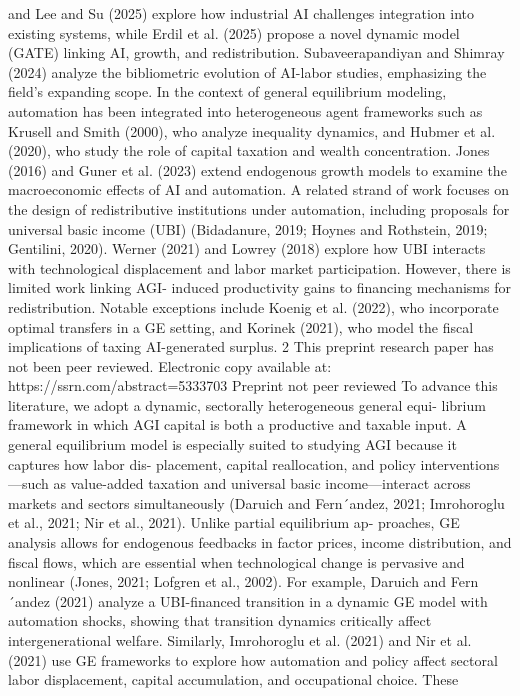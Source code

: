 and Lee and Su (2025) explore how industrial AI challenges integration into existing systems,
while Erdil et al. (2025) propose a novel dynamic model (GATE) linking AI, growth, and
redistribution. Subaveerapandiyan and Shimray (2024) analyze the bibliometric evolution
of AI-labor studies, emphasizing the field’s expanding scope.
In the context of general equilibrium modeling, automation has been integrated into
heterogeneous agent frameworks such as Krusell and Smith (2000), who analyze inequality
dynamics, and Hubmer et al. (2020), who study the role of capital taxation and wealth
concentration.
Jones (2016) and Guner et al. (2023) extend endogenous growth models
to examine the macroeconomic effects of AI and automation.
A related strand of work
focuses on the design of redistributive institutions under automation, including proposals
for universal basic income (UBI) (Bidadanure, 2019; Hoynes and Rothstein, 2019; Gentilini,
2020).
Werner (2021) and Lowrey (2018) explore how UBI interacts with technological
displacement and labor market participation. However, there is limited work linking AGI-
induced productivity gains to financing mechanisms for redistribution. Notable exceptions
include Koenig et al. (2022), who incorporate optimal transfers in a GE setting, and Korinek
(2021), who model the fiscal implications of taxing AI-generated surplus.
2
This preprint research paper has not been peer reviewed. Electronic copy available at: https://ssrn.com/abstract=5333703
Preprint not peer reviewed
To advance this literature, we adopt a dynamic, sectorally heterogeneous general equi-
librium framework in which AGI capital is both a productive and taxable input. A general
equilibrium model is especially suited to studying AGI because it captures how labor dis-
placement, capital reallocation, and policy interventions—such as value-added taxation and
universal basic income—interact across markets and sectors simultaneously (Daruich and
Fern´andez, 2021; Imrohoroglu et al., 2021; Nir et al., 2021). Unlike partial equilibrium ap-
proaches, GE analysis allows for endogenous feedbacks in factor prices, income distribution,
and fiscal flows, which are essential when technological change is pervasive and nonlinear
(Jones, 2021; Lofgren et al., 2002). For example, Daruich and Fern´andez (2021) analyze
a UBI-financed transition in a dynamic GE model with automation shocks, showing that
transition dynamics critically affect intergenerational welfare. Similarly, Imrohoroglu et al.
(2021) and Nir et al. (2021) use GE frameworks to explore how automation and policy
affect sectoral labor displacement, capital accumulation, and occupational choice. These
